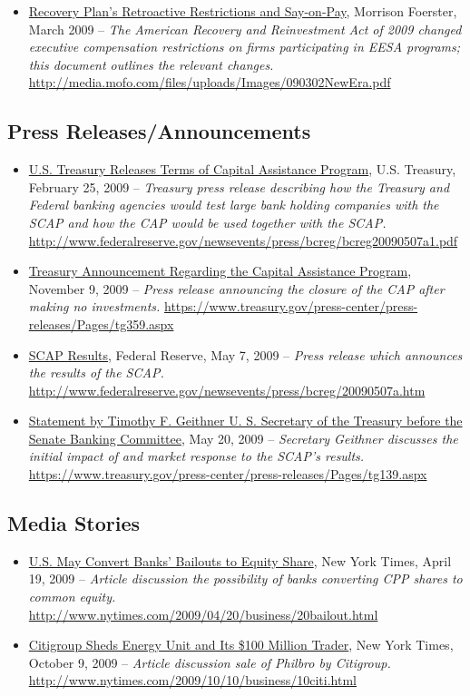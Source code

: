 \documentclass[12pt]{article}
\begin{document}
\begin{itemize}
\item
\ul{Recovery Plan's Retroactive Restrictions and Say-on-Pay}, Morrison Foerster, March 2009 -- \emph{The American Recovery and Reinvestment Act of 2009 changed executive compensation restrictions on firms participating in EESA programs; this document outlines the relevant changes.} \url{http://media.mofo.com/files/uploads/Images/090302NewEra.pdf}
\end{itemize}

\subsection{Press Releases/Announcements}

\begin{itemize}
\item
\ul{U.S. Treasury Releases Terms of Capital Assistance Program}, U.S. Treasury, February 25, 2009 -- \emph{Treasury press release describing how the Treasury and Federal banking agencies would test large bank holding companies with the SCAP and how the CAP would be used together with the SCAP.} \url{http://www.federalreserve.gov/newsevents/press/bcreg/bcreg20090507a1.pdf}
\item
\ul{Treasury Announcement Regarding the Capital Assistance Program}, November 9, 2009 -- \emph{Press release announcing the closure of the CAP after making no investments.} \url{https://www.treasury.gov/press-center/press-releases/Pages/tg359.aspx}
\item
\ul{SCAP
 Results}, Federal Reserve, May 7, 2009 -- \emph{Press release which
 announces the results of the SCAP.} \url{http://www.federalreserve.gov/newsevents/press/bcreg/20090507a.htm}
\item
\ul{Statement
 by Timothy F. Geithner U. S. Secretary of the Treasury before the
 Senate Banking Committee}, May 20, 2009 -- \emph{Secretary Geithner
 discusses the initial impact of and market response to the SCAP's
 results.} \url{https://www.treasury.gov/press-center/press-releases/Pages/tg139.aspx}
\end{itemize}

\subsection{Media Stories}

\begin{itemize}
\item
\ul{U.S. May Convert Banks' Bailouts to Equity Share}, New York Times, April 19,
 2009 -- \emph{Article discussion the possibility of banks converting CPP shares to common equity.} \url{http://www.nytimes.com/2009/04/20/business/20bailout.html}
\item
\ul{Citigroup Sheds Energy Unit and Its \$100 Million Trader}, New York Times, October 9,
 2009 -- \emph{Article discussion sale of Philbro by Citigroup.} \url{http://www.nytimes.com/2009/10/10/business/10citi.html}
\end{itemize}
\end{document}
